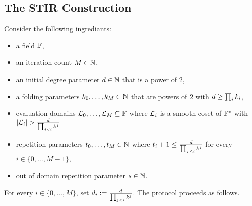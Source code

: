 \subsection{The STIR Construction}\label{subsec:stir_constr}
Consider the following ingrediants:
\begin{itemize}
    \item a field $\mathbb{F}$,
    \item an iteration count $M\in\mathbb{N}$,
    \item an initial degree parameter $d\in\mathbb{N}$ that is a power of $2$,
    \item a folding parameters $k_0,\ldots,k_M\in\mathbb{N}$ that are powers of $2$ with $d\geq\prod_{i}k_i$,
    \item evaluation domains $\mathcal{L}_0,\ldots,\mathcal{L}_M\subseteq\mathbb{F}$ where $\mathcal{L}_i$ is a smooth coset of ${\mathbb{F}}^*$ with $|\evaldomain_i|>\frac{\degree}{\prod_{j<i}k^j}$
    \item repetition parameters $t_0,\ldots,t_M\in\mathbb{N}$ where $t_i+1\leq\frac{d}{\prod_{j\leq i}k^j}$ for every $i\in\{0,\ldots,M-1\}$,
    \item out of domain repetition parameter $s\in\mathbb{N}$.
\end{itemize}
For every $i\in\{0,\ldots,M\}$, set $d_i:=\frac{d}{\prod_{j<i}k^j}$. The protocol proceeds as follows.

